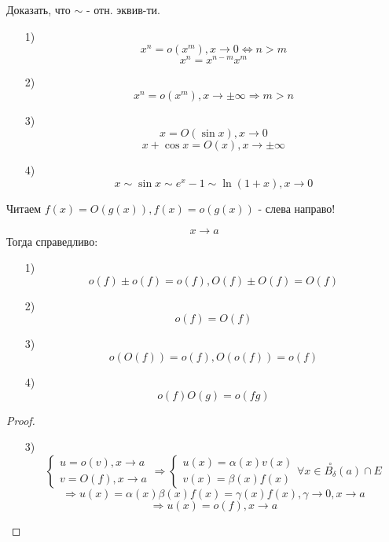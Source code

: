 \begin{task}
Доказать, что $\sim$ - отн. эквив-ти.
\end{task}
\begin{example}
\begin{itemize}
  \item [1) ] \[
  x^{n} = o(x^{m}), x \rightarrow 0 \iff n > m
  \]
  \[
  x^{n} = x^{n - m} x^{m}
  \]
\item [2) ] \[
  x^{n} = o(x^{m}), x \rightarrow \pm \infty \Rightarrow m > n
\]
\item [3) ] \[
  x = O(\sin x), x \rightarrow 0
\]
  \[
  x + \cos x = O(x), x \rightarrow \pm \infty
  \]
\item [4) ] \[
  x \sim \sin x \sim e^{x} - 1 \sim \ln(1 + x), x \rightarrow 0
\]
\end{itemize}
\end{example}
\begin{note}
  Читаем $f(x) = O(g(x)), f(x) = o(g(x))$ - слева направо!
\end{note}
\begin{lemma}
\[
x \rightarrow a
\]
Тогда справедливо:
\begin{itemize}
  \item [1) ] \[
  o(f) \pm o(f) = o(f), O(f) \pm O(f) = O(f)
  \]
\item [2) ] \[
  o(f) = O(f)
\]
\item [3) ] \[
  o(O(f)) = o(f), O(o(f)) = o(f)
\]
\item [4) ] \[
  o(f)O(g) = o(fg)
\]
\end{itemize}
\end{lemma}
\begin{proof}
\begin{itemize}
  \item [3) ]\[
      \begin{cases}
  u = o(v), x \rightarrow a \\
  v = O(f), x \rightarrow a
      \end{cases} \Rightarrow 
      \begin{cases}
       u(x) = \alpha(x)v(x)  \\
       v(x) = \beta(x)f(x)
      \end{cases} \forall x \in \overset{\circ}{B_{\delta}}(a) \cap E
  \]
  \[
  \Rightarrow u(x) = \alpha(x)\beta(x)f(x) = \gamma(x)f(x), \gamma \rightarrow 0, x \rightarrow a
  \]
  \[
  \Rightarrow u(x) = o(f), x \rightarrow a
  \]
\end{itemize}
\end{proof}
